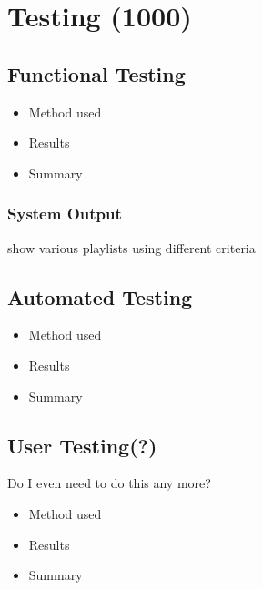 \chapter{Testing (1000)}
\section{Functional Testing}
\begin{itemize}
	\item Method used
	\item Results
	\item Summary
\end{itemize}
\subsection{System Output}
show various playlists using different criteria
\section{Automated Testing}
\begin{itemize}
	\item Method used
	\item Results
	\item Summary
\end{itemize}
\section{User Testing(?)}
Do I even need to do this any more?
\begin{itemize}
	\item Method used
	\item Results
	\item Summary
\end{itemize}
